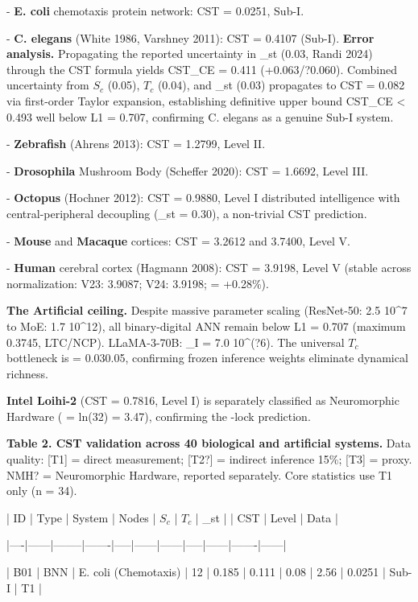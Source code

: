 \documentclass[a4paper,12pt]{article}
\begin{document}
- \textbf{E. coli} chemotaxis protein network: CST = 0.0251, Sub-I.

- \textbf{C. elegans} (White 1986, Varshney 2011): CST = 0.4107 (Sub-I). \textbf{Error analysis.} Propagating the reported uncertainty in _st (0.03, Randi 2024) through the CST formula yields CST_CE = 0.411 (+0.063/?0.060). Combined uncertainty from $S_c$ (0.05), $T_c$ (0.04), and _st (0.03) propagates to CST = 0.082 via first-order Taylor expansion, establishing definitive upper bound CST_CE < 0.493  well below L1 = 0.707, confirming C. elegans as a genuine Sub-I system.

- \textbf{Zebrafish} (Ahrens 2013): CST = 1.2799, Level II.

- \textbf{Drosophila} Mushroom Body (Scheffer 2020): CST = 1.6692, Level III.

- \textbf{Octopus} (Hochner 2012): CST = 0.9880, Level I  distributed intelligence with central-peripheral decoupling (_st = 0.30), a non-trivial CST prediction.

- \textbf{Mouse} and \textbf{Macaque} cortices: CST = 3.2612 and 3.7400, Level V.

- \textbf{Human} cerebral cortex (Hagmann 2008): CST = 3.9198, Level V (stable across normalization: V23: 3.9087; V24: 3.9198;  = +0.28\%).


\textbf{The Artificial ceiling.} Despite massive parameter scaling (ResNet-50: 2.5  10^7 to MoE: 1.7  10^12), all binary-digital ANN remain below L1 = 0.707 (maximum 0.3745, LTC/NCP). LLaMA-3-70B: _I = 7.0  10^(?6). The universal $T_c$ bottleneck is  = 0.030.05, confirming frozen inference weights eliminate dynamical richness.


\textbf{Intel Loihi-2} (CST = 0.7816, Level I) is separately classified as Neuromorphic Hardware ( = ln(32) = 3.47), confirming the -lock prediction.



\textbf{Table 2. CST validation across 40 biological and artificial systems.} Data quality: [T1] = direct measurement; [T2?] = indirect inference 15\%; [T3] = proxy. NMH? = Neuromorphic Hardware, reported separately. Core statistics use T1 only (n = 34).


| ID | Type | System | Nodes | $S_c$ | $T_c$ | _st |  | CST | Level | Data |

|----|------|--------|-------|-----|------|------|-----|------|-------|------|

| B01 | BNN | E. coli (Chemotaxis) | 12 | 0.185 | 0.111 | 0.08 | 2.56 | 0.0251 | Sub-I | T1 |
\end{document}
